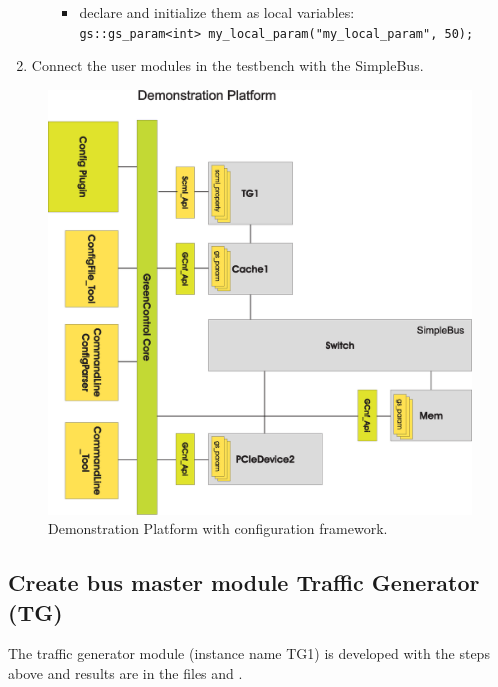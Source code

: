 \begin{samepage}
\begin{enumerate}
\begin{itemize}
\begin{itemize}
			\item declare and initialize them as local variables:\\
			\lstinline|gs::gs_param<int> my_local_param("my_local_param", 50);|

		\end{itemize}
	\end{itemize}

	\item Connect the user modules in the testbench with the SimpleBus.

\end{enumerate}
\end{samepage}

\begin{figure}[htbp]
	\centerline{
		\includegraphics[width=\textwidth]{DemoPlatformWconfig.eps}} 
	\caption{Demonstration Platform with configuration framework. }
	\label{fig:DemoPlatformWconfig}
\end{figure}


\subsection{Create bus master module Traffic Generator (TG)}

The traffic generator module (instance name TG1) is developed with the
steps above and results are in the files  and .


